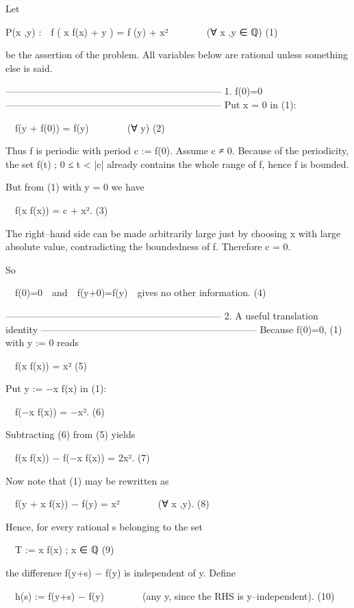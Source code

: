 Let  

P(x ,y) : f ( x f(x) + y ) = f (y) + x²    (∀ x ,y ∈ ℚ)        (1)

be the assertion of the problem.  
All variables below are rational unless something else is said.

--------------------------------------------------------------------
1.  f(0)=0
--------------------------------------------------------------------
Put x = 0 in (1):

 f(y + f(0)) = f(y)    (∀ y)                                   (2)

Thus f is periodic with period c := f(0).  
Assume c ≠ 0.  
Because of the periodicity, the set { f(t) ; 0 ≤ t < |c| } already contains the whole
range of f, hence f is bounded.

But from (1) with y = 0 we have

 f(x f(x)) = c + x².                             (3)

The right–hand side can be made arbitrarily large just by choosing x with large
absolute value, contradicting the boundedness of f.  
Therefore c = 0.

So

 f(0)=0 and f(y+0)=f(y) gives no other information.             (4)


--------------------------------------------------------------------
2.  A useful translation identity
--------------------------------------------------------------------
Because f(0)=0, (1) with y := 0 reads

 f(x f(x)) = x²                                                  (5)

Put y := −x f(x) in (1):

 f(−x f(x)) = −x².                                              (6)

Subtracting (6) from (5) yields

 f(x f(x)) − f(−x f(x)) = 2x².                                  (7)

Now note that (1) may be rewritten as

 f(y + x f(x)) − f(y) = x²    (∀ x ,y).                      (8)

Hence, for every rational s belonging to the set

 T := { x f(x) ; x ∈ ℚ }                                        (9)

the difference f(y+s) − f(y) is independent of y.  
Define

 h(s) := f(y+s) − f(y)    (any y, since the RHS is y–independent).     (10)

